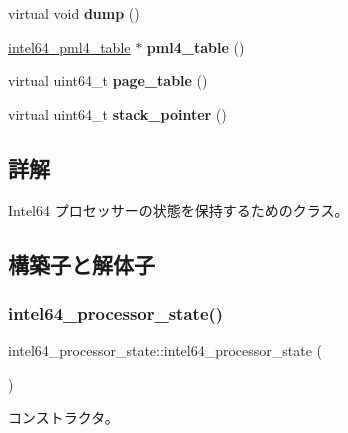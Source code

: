 \begin{DoxyCompactItemize}
virtual void {\bfseries dump} ()
\item 
\hypertarget{classintel64__processor__state_add5331bf8055914de6d6e83f8c40ea6b}{}\label{classintel64__processor__state_add5331bf8055914de6d6e83f8c40ea6b} 
\hyperlink{classintel64__pml4__table}{intel64\+\_\+pml4\+\_\+table} $\ast$ {\bfseries pml4\+\_\+table} ()
\item 
\hypertarget{classintel64__processor__state_a6a9393a7006e9b054b14021b6d609ea2}{}\label{classintel64__processor__state_a6a9393a7006e9b054b14021b6d609ea2} 
virtual uint64\+\_\+t {\bfseries page\+\_\+table} ()
\item 
\hypertarget{classintel64__processor__state_ab2dbf53bc4ad5e495e958013b57bc648}{}\label{classintel64__processor__state_ab2dbf53bc4ad5e495e958013b57bc648} 
virtual uint64\+\_\+t {\bfseries stack\+\_\+pointer} ()
\end{DoxyCompactItemize}


\subsection{詳解}
Intel64 プロセッサーの状態を保持するためのクラス。 

\subsection{構築子と解体子}
\hypertarget{classintel64__processor__state_ab3a8e501f61ac644097d0fb270a48848}{}\label{classintel64__processor__state_ab3a8e501f61ac644097d0fb270a48848} 
\subsubsection{\texorpdfstring{intel64\+\_\+processor\+\_\+state()}{intel64\_processor\_state()}\hspace{0.1cm}{\footnotesize\ttfamily [1/3]}}
{\footnotesize\ttfamily intel64\+\_\+processor\+\_\+state\+::intel64\+\_\+processor\+\_\+state (\begin{DoxyParamCaption}{ }\end{DoxyParamCaption})}

コンストラクタ。 \hypertarget{classintel64__processor__state_a080fbfaabb6819531c70ed92f4c0fff8}{}\label{classintel64__processor__state_a080fbfaabb6819531c70ed92f4c0fff8} 

